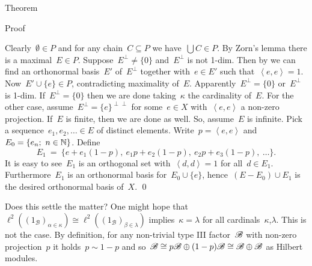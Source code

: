 \documentclass[b]{subfiles}
\begin{document}
\begin{parsec}
\begin{point}{Theorem}
\begin{point}{Proof}
\begin{point}
\begin{inparaenum}
\end{inparaenum}
Clearly~$\emptyset\in P$
and for any chain~$C \subseteq P$
    we have~$\bigcup C \in P$.
By Zorn's lemma there is a maximal~$E \in P$.
Suppose~$E^\perp \neq \{0\}$ and~$E^\perp$ is not 1-dim.
Then by 
    we can find an orthonormal basis~$E'$ of~$E^\perp$
    together with~$e \in E'$ such that~$\left<e,e\right>=1$.
Now~$E' \cup \{e\} \in P$, contradicting maximality of~$E$.
Apparently~$E^\perp = \{0\}$ or~$E^\perp$ is 1-dim.
If~$E^\perp = \{0\}$
    then we are done
    taking~$\kappa$ the cardinality of~$E$.
For the other case, assume~$E^\perp = \{e\}^{\perp\perp}$
    for some~$e \in X$ with~$\left<e,e\right>$ a non-zero projection.
If~$E$ is finite, then we are done as well.
So, assume~$E$ is infinite.
Pick a sequence~$e_1, e_2, \ldots \in E$ of distinct elements.
Write~$p = \left<e,e\right>$
    and~$E_0 = \{e_n;\ n\in \mathbb{N}\}$.
Define
\begin{equation*}
    E_1 \ =\  \{e + e_1(1-p), \ e_1p + e_2(1-p),\  e_2p  +e_3(1-p),\  \ldots \}.
\end{equation*}
It is easy to see~$E_1$ is an orthogonal set
    with~$\left<d,d\right>=1$ for all~$d \in E_1$.
Furthermore~$E_1$ is an orthonormal basis for~$E_0 \cup \{e\}$,
    hence~$(E - E_0) \cup E_1$ is the desired orthonormal basis of~$X$. \qed
\end{point}
\end{point}
\end{point}
\begin{point}%
Does this settle the matter?  One might hope
    that~$\ell^2((1_{\mathscr{B}})_{\alpha \in \kappa}) \cong
        \ell^2((1_{\mathscr{B}})_{\beta\in\lambda})$
    implies~$\kappa=\lambda$ for all cardinals~$\kappa$,$\lambda$.
This is not the case.
By definition, for any non-trivial type III factor~$\mathscr{B}$
    with non-zero projection~$p$
    it holds~$p \sim 1 -p$
    and so~$\mathscr{B} \cong p\mathscr{B} \oplus (1-p)\mathscr{B} \cong 
    \mathscr{B} \oplus \mathscr{B}$ as Hilbert modules.
\end{point}
\end{parsec}
\end{document}
